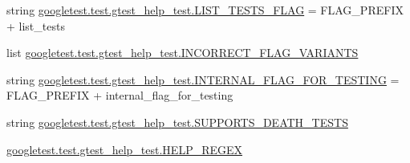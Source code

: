 \begin{DoxyCompactItemize}
\item 
string \mbox{\hyperlink{namespacegoogletest_1_1test_1_1gtest__help__test_ae2dc57dd4dac280d307902e690832e7b}{googletest.\+test.\+gtest\+\_\+help\+\_\+test.\+L\+I\+S\+T\+\_\+\+T\+E\+S\+T\+S\+\_\+\+F\+L\+AG}} = F\+L\+A\+G\+\_\+\+P\+R\+E\+F\+IX + \textquotesingle{}list\+\_\+tests\textquotesingle{}
\item 
list \mbox{\hyperlink{namespacegoogletest_1_1test_1_1gtest__help__test_ac07fe8f8ad8fa6a5ddaa09726c19d6fe}{googletest.\+test.\+gtest\+\_\+help\+\_\+test.\+I\+N\+C\+O\+R\+R\+E\+C\+T\+\_\+\+F\+L\+A\+G\+\_\+\+V\+A\+R\+I\+A\+N\+TS}}
\item 
string \mbox{\hyperlink{namespacegoogletest_1_1test_1_1gtest__help__test_a49459de300134ea14cdcd284388ff006}{googletest.\+test.\+gtest\+\_\+help\+\_\+test.\+I\+N\+T\+E\+R\+N\+A\+L\+\_\+\+F\+L\+A\+G\+\_\+\+F\+O\+R\+\_\+\+T\+E\+S\+T\+I\+NG}} = F\+L\+A\+G\+\_\+\+P\+R\+E\+F\+IX + \textquotesingle{}internal\+\_\+flag\+\_\+for\+\_\+testing\textquotesingle{}
\item 
string \mbox{\hyperlink{namespacegoogletest_1_1test_1_1gtest__help__test_aa00db51f0e5d3311467f62945df8e2c7}{googletest.\+test.\+gtest\+\_\+help\+\_\+test.\+S\+U\+P\+P\+O\+R\+T\+S\+\_\+\+D\+E\+A\+T\+H\+\_\+\+T\+E\+S\+TS}}
\item 
\mbox{\hyperlink{namespacegoogletest_1_1test_1_1gtest__help__test_a41a115d419dbaac83851205b41edb00e}{googletest.\+test.\+gtest\+\_\+help\+\_\+test.\+H\+E\+L\+P\+\_\+\+R\+E\+G\+EX}}
\end{DoxyCompactItemize}
